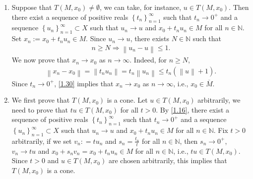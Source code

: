 \documentclass[a4paper]{article}
\numberwithin{equation}{section}
\begin{document}
\begin{enumerate}
\item Suppose that $T\left( {M,{x_0}} \right) \ne \emptyset $, we can take, for instance, $u\in T\left(M,x_0\right)$. Then there exist a sequence of positive reals $\left\{ {{t_n}} \right\}_{n = 1}^\infty $ such that $t_n \to 0^+$ and a sequence $\left\{ {{u_n}} \right\}_{n = 1}^\infty  \subset X$ such that $u_n\to u$ and $x_0+t_n u_n\in M$ for all $n\in \mathbb{N}$. Set $x_n:=x_0+t_nu_n \in M$. Since $u_n\to u$, there exists $N\in \mathbb{N}$ such that 
\begin{align}
n \ge N \Rightarrow \left\| {{u_n} - u} \right\| \le 1.
\end{align}
We now prove that $x_n\to x_0$ as $n\to \infty$. Indeed, for $n\ge N$,
\begin{align}
\label{1.30}
\left\| {{x_n} - {x_0}} \right\| = \left\| {{t_n}{u_n}} \right\| = {t_n}\left\| {{u_n}} \right\| \le {t_n}\left( {\left\| u \right\| + 1} \right).
\end{align}
Since $t_n\to 0^+$, \eqref{1.30} implies that $x_n \to x_0$ as $n\to \infty$, i.e., $x_0\in \overline{M}$. 
\item We first prove that $T\left(M,x_0\right)$ is a cone. Let $u\in T\left(M,x_0\right)$ arbitrarily, we need to prove that $tu\in T\left(M,x_0\right)$ for all $t>0$. By \eqref{1.16}, there exist a sequence of positive reals $\left\{ {{t_n}} \right\}_{n = 1}^\infty $ such that $t_n\to 0^+$ and a sequence $\left\{ {{u_n}} \right\}_{n = 1}^\infty  \subset X$ such that $u_n\to u$ and ${x_0} + {t_n}{u_n} \in M$ for all $n\in \mathbb{N}$. Fix $t>0$ arbitrarily, if we set ${v_n}: = t{u_n}$ and ${s_n} = \frac{{{t_n}}}{t}$ for all $n\in \mathbb{N}$, then $s_n\to 0^+$, ${v_n} \to tu$ and ${x_0} + {s_n}{v_n} = {x_0} + {t_n}{u_n} \in M$ for all $n\in \mathbb{N}$, i.e., $tu\in T\left(M,x_0\right)$. Since $t>0$ and $u\in T\left(M,x_0\right)$ are chosen arbitrarily, this implies that $T\left(M,x_0\right)$ is a cone. 


\end{enumerate}
\end{document}

